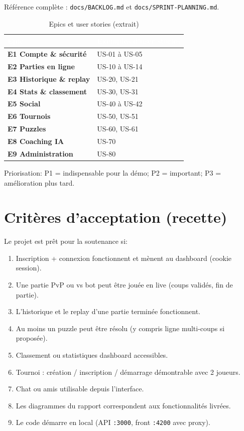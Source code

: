 \documentclass[12pt,a4paper,oneside]{article}
\begin{document}
Référence complète : \texttt{docs/BACKLOG.md} et \texttt{docs/SPRINT-PLANNING.md}.

\begin{table}[H]
\centering
\caption{Epics et user stories (extrait)}
\begin{tabularx}{\linewidth}{|>{\bfseries}l|X|}
\hline
\rowcolor{sectionblue}
\textcolor{white}{Epic} & \textcolor{white}{\textbf{Exemples d'user stories}} \\
\hline
E1 Compte \& sécurité & US-01 à US-05 \\
\hline
E2 Parties en ligne & US-10 à US-14 \\
\hline
E3 Historique \& replay & US-20, US-21 \\
\hline
E4 Stats \& classement & US-30, US-31 \\
\hline
E5 Social & US-40 à US-42 \\
\hline
E6 Tournois & US-50, US-51 \\
\hline
E7 Puzzles & US-60, US-61 \\
\hline
E8 Coaching IA & US-70 \\
\hline
E9 Administration & US-80 \\
\hline
\end{tabularx}
\end{table}

\noindent Priorisation: P1 = indispensable pour la démo; P2 = important; P3 = amélioration plus tard.

\section{Critères d'acceptation (recette)}

Le projet est prêt pour la soutenance si:
\begin{enumerate}
  \item Inscription + connexion fonctionnent et mènent au dashboard (cookie session).
  \item Une partie PvP ou vs bot peut être jouée en live (coups validés, fin de partie).
  \item L'historique et le replay d'une partie terminée fonctionnent.
  \item Au moins un puzzle peut être résolu (y compris ligne multi-coups si proposée).
  \item Classement ou statistiques dashboard accessibles.
  \item Tournoi : création / inscription / démarrage démontrable avec 2 joueurs.
  \item Chat ou amis utilisable depuis l'interface.
  \item Les diagrammes du rapport correspondent aux fonctionnalités livrées.
  \item Le code démarre en local (API \texttt{:3000}, front \texttt{:4200} avec proxy).
\end{enumerate}
\end{document}
